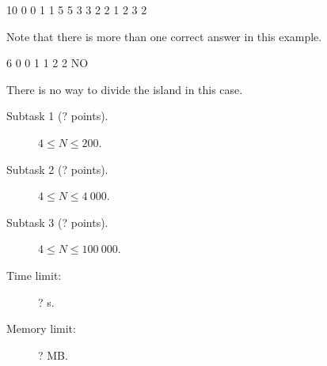 \documentclass{boi2014}
\begin{document}
    \clearpage

    \Examples
    \example
    {
        10  0  0  1  1  5  5  3  3  2  2
    }
    {
        1 2 3 2
    }
    {
        Note that there is more than one correct answer in this example.

        \begin{center}
        \end{center}
    }

    \example
    {
        6  0  0  1  1  2  2
    }
    {
        NO
    }
    {
        There is no way to divide the island in this case.
        \begin{center}
        \end{center}
    }

    \Scoring

    \begin{description}
        \item[Subtask 1 (? points).] $4 \le N \le 200$.
        \item[Subtask 2 (? points).] $4 \le N \le 4\ 000$.
        \item[Subtask 3 (? points).] $4 \le N \le 100\ 000$.
    \end{description}

    \Constraints

    \begin{description}
        \item[Time limit:] ? s.
        \item[Memory limit:] ? MB.
    \end{description}
\end{document}

